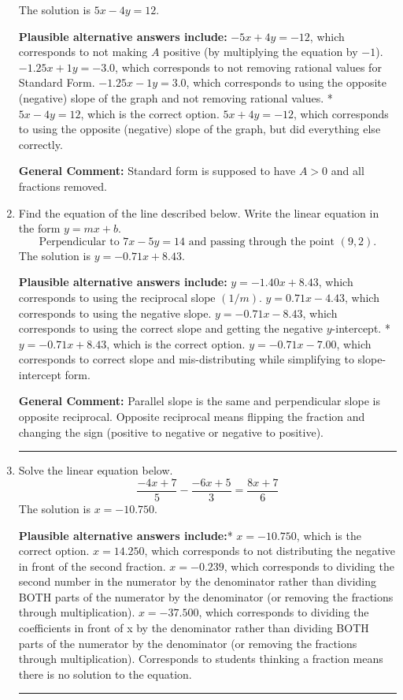 \documentclass{extbook}[14pt]
\newcommand{\litem}[1]{\item #1

\rule{\textwidth}{0.4pt}}
\begin{document}
\begin{enumerate}
{The solution is \( 5x - 4y = 12 \).\begin{enumerate}[label=\Alph*.]
\textbf{Plausible alternative answers include:} $-5x + 4y = -12$, which corresponds to not making $A$ positive (by multiplying the equation by $-1$).
 $-1.25x + 1y = -3.0$, which corresponds to not removing rational values for Standard Form.
 $-1.25x - 1y = 3.0$, which corresponds to using the opposite (negative) slope of the graph and not removing rational values.
* $5x - 4y = 12$, which is the correct option.
 $5x + 4y = -12$, which corresponds to using the opposite (negative) slope of the graph, but did everything else correctly.
\end{enumerate}

\textbf{General Comment:} Standard form is supposed to have $A > 0$ and all fractions removed.
}
\litem{
Find the equation of the line described below. Write the linear equation in the form $y=mx+b$.
\[ \text{Perpendicular to } 7 x - 5 y = 14 \text{ and passing through the point } (9, 2). \]The solution is \( y = -0.71x + 8.43 \).\begin{enumerate}[label=\Alph*.]
\textbf{Plausible alternative answers include:} $y = -1.40x + 8.43$, which corresponds to using the reciprocal slope $(1/m)$.
 $y = 0.71x - 4.43$, which corresponds to using the negative slope.
 $y = -0.71x - 8.43$, which corresponds to using the correct slope and getting the negative $y$-intercept.
* $y = -0.71x + 8.43$, which is the correct option.
 $y = -0.71x - 7.00$, which corresponds to correct slope and mis-distributing while simplifying to slope-intercept form.
\end{enumerate}

\textbf{General Comment:} Parallel slope is the same and perpendicular slope is opposite reciprocal. Opposite reciprocal means flipping the fraction and changing the sign (positive to negative or negative to positive).
}
\litem{
Solve the linear equation below.
\[ \frac{-4x + 7}{5} - \frac{-6x + 5}{3} = \frac{8x + 7}{6} \]The solution is \( x = -10.750 \).\begin{enumerate}[label=\Alph*.]
\textbf{Plausible alternative answers include:}* $x = -10.750$, which is the correct option.
 $x = 14.250$, which corresponds to not distributing the negative in front of the second fraction.
 $x = -0.239$, which corresponds to dividing the second number in the numerator by the denominator rather than dividing BOTH parts of the numerator by the denominator (or removing the fractions through multiplication).
 $x = -37.500$, which corresponds to dividing the coefficients in front of x by the denominator rather than dividing BOTH parts of the numerator by the denominator (or removing the fractions through multiplication).
Corresponds to students thinking a fraction means there is no solution to the equation.
\end{enumerate}

}
\end{enumerate}
\end{document}
